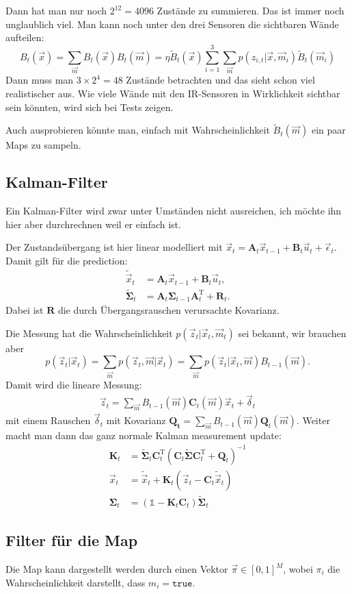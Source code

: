 \documentclass{scrartcl}
\newcommand{\TT}{\mathrm{T}}
\newcommand{\true}{\texttt{true}}
\newcommand{\mat}[1]{\mathbf{#1}}
\renewcommand{\|}{\vert}
\newcommand{\eye}[1][]{\mathbb{1}_{#1}}
\begin{document}

Dann hat man nur noch $2^{12} = 4096$ Zustände zu summieren.
Das ist immer noch unglaublich viel.
Man kann noch unter den drei Sensoren die sichtbaren Wände aufteilen:
\[
    B_t(\vec{x}) = \sum_{\vec{m}} B_t(\vec{x}) B_t(\vec{m}) = 
    \eta \tilde B_t(\vec{x}) \sum_{i=1}^3 \sum_{\vec{m}} p(z_{i,t} \| \vec{x}, \vec{m}_i) \tilde B_t(\vec{m}_i)
\]
Dann muss man $3 \times 2^4 = 48$ Zustände betrachten und das sieht schon viel realistischer aus.
Wie viele Wände mit den IR-Sensoren in Wirklichkeit sichtbar sein könnten, wird sich bei Tests zeigen.

Auch ausprobieren könnte man, einfach mit Wahrscheinlichkeit $\tilde B_t(\vec{m})$ ein paar Maps zu sampeln.

\subsection{Kalman-Filter}
Ein Kalman-Filter wird zwar unter Umständen nicht ausreichen, ich möchte ihn hier aber durchrechnen weil er einfach ist.

Der Zustandsübergang ist hier linear modelliert mit $\vec{x}_t = \mat{A}_t \vec{x}_{t-1} + \mat{B}_t \vec{u}_t + \vec{\epsilon}_t$.
Damit gilt für die prediction:
\begin{align}
    \tilde{\vec{x}}_t &= \mat{A}_t \vec{x}_{t-1} + \mat{B}_t \vec{u}_t,
    \\
    \mat{\tilde \Sigma}_t &= \mat{A}_t \mat{\Sigma}_{t-1} \mat{A}_t^\TT + \mat{R}_t.
\end{align}
Dabei ist $\mat R$ die durch Übergangsrauschen verursachte Kovarianz.

Die Messung hat die Wahrscheinlichkeit $p(\vec{z}_t \| \vec{x}_t, \vec{m}_t)$ sei bekannt, wir brauchen aber 
\[
    p(\vec{z}_t \| \vec{x}_t) = \sum_{\vec{m}} p(\vec{z}_t, \vec{m} \| \vec{x}_t)
	= \sum_{\vec{m}} p(\vec{z}_t \| \vec{x}_t, \vec{m}) B_{t-1}(\vec{m}).
\]
Damit wird die lineare Messung:
\begin{align}
	\vec{z}_t = \sum_{\vec{m}} B_{t-1}(\vec{m}) \mat{C}_t(\vec{m}) \vec{x}_t + \vec{\delta}_t
\end{align}
mit einem Rauschen $\vec{\delta}_t$ mit Kovarianz $\mat{Q_t} = \sum_{\vec m}
B_{t-1}(\vec{m}) \mat{Q}_t(\vec{m})$.
Weiter macht man dann das ganz normale Kalman measurement update:
\begin{align}
    \mat{K}_t &= \mat{\tilde\Sigma}_t \mat{C}_t^\TT (\mat{C}_t \mat{\tilde\Sigma} \mat{C}_t^\TT + \mat{Q}_t)^{-1}
    \\
    \vec{x}_t &= \tilde{\vec{x}}_t + \mat{K}_t (\vec{z}_t - \mat{C}_t \tilde{\vec{x}}_t )
    \\
    \mat{\Sigma}_t &= (\eye - \mat{K}_t \mat{C}_t) \mat{\tilde\Sigma}_t
\end{align}

\subsection{Filter für die Map}
Die Map kann dargestellt werden durch einen Vektor $\vec{\pi} \in [0, 1]^M$,
wobei $\pi_i$ die Wahrscheinlichkeit darstellt, dass $m_i = \true$.
\end{document}
